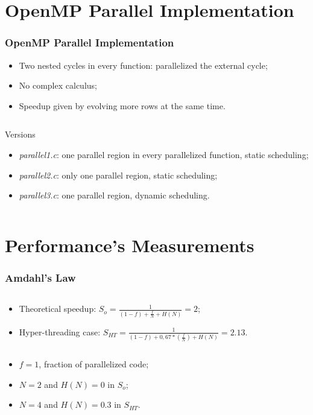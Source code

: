 \documentclass{beamer}
\begin{document}
\section{OpenMP Parallel Implementation}
\begin{frame}
	\frametitle{OpenMP Parallel Implementation}
	\begin{itemize}
		\item Two nested cycles in every function: parallelized the external cycle;
		\item No complex calculus;
		\item Speedup given by evolving more rows at the same time.
	\end{itemize}
	\vfill
	\begin{columns}
		\begin{block}{Versions}
			\begin{itemize}
				\item \emph{parallel1.c}: one parallel region in every parallelized function, static scheduling;
				\item \emph{parallel2.c}: only one parallel region, static scheduling;
				\item \emph{parallel3.c}: one parallel region, dynamic scheduling.
			\end{itemize}
		\end{block}
	\end{columns}
\end{frame}

\section{Performance's Measurements}
\begin{frame}
	\frametitle{Amdahl's Law}
	\begin{columns}
		\column{0.9\textwidth}
		\begin{block}{}
			\begin{itemize}
				\item Theoretical speedup: $S_{o} = \frac{1}{(1-f) + \frac{f}{N} + H(N)} = 2$;
				\item Hyper-threading case: $S_{HT} = \frac{1}{(1-f) + 0,67*(\frac{f}{N}) + H(N)} = 2.13$.
			\end{itemize}
		\end{block}
	\end{columns}
	\vfill
	\begin{itemize}
		\item $f = 1$, fraction of parallelized code;
		\item $N = 2$ and $H(N) = 0$ in $S_{o}$;
		\item $N = 4$ and $H(N) = 0.3$ in $S_{HT}$.
	\end{itemize}
\end{frame}
\end{document}
